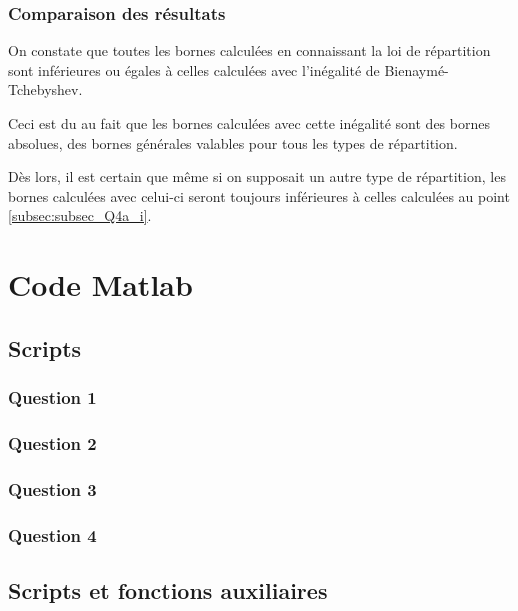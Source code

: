 \documentclass[a4paper, 12pt]{article}
\begin{document}
	\subsubsection{Comparaison des résultats}
	On constate que toutes les bornes calculées en connaissant la loi de répartition sont inférieures ou égales à celles calculées avec l'inégalité de Bienaymé-Tchebyshev.\par
	Ceci est du au fait que les bornes calculées avec cette inégalité sont des bornes absolues, \cad des bornes générales valables pour tous les types de répartition.\par
	Dès lors, il est certain que même si on supposait un autre type de répartition, les bornes calculées avec celui-ci seront toujours inférieures à celles calculées au point \ref{subsec:subsec_Q4a_i}.
	\appendix
	\restoregeometry
	\section{Code Matlab}
	\subsection{Scripts}
	\subsubsection*{Question 1}
	
	
	
	\subsubsection*{Question 2}
	
	
	\subsubsection*{Question 3}
	
	
	
	\subsubsection*{Question 4}
	
	\subsection{Scripts et fonctions auxiliaires}
	
	
\end{document}
